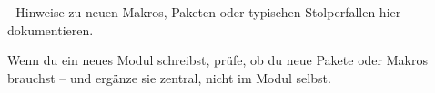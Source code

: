 \textbf{\textcolor{ctmmBlue}{\1}} - Hinweise zu neuen Makros, Paketen oder typischen Stolperfallen hier dokumentieren.

\textbf{\textcolor{ctmmBlue}{\1}} Wenn du ein neues Modul schreibst, prüfe, ob du neue Pakete oder Makros brauchst -- und ergänze sie zentral, nicht im Modul selbst.
